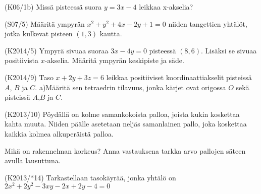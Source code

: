 \begin{tehtava}(K06/1b)
	Missä pisteessä suora $y=3x-4$ leikkaa x-akselia? 
\end{tehtava}

\begin{tehtava} (S07/5)
	Määritä ympyrän $x^2+y^2+4x-2y+1=0$ niiden tangettien yhtälöt, jotka kulkevat pisteen $(1,3)$ kautta.
\end{tehtava}



\begin{tehtava}(K2014/5)
Ympyrä sivuaa suoraa $3x-4y=0$ pisteessä $(8,6)$. Lisäksi se sivuaa positiivista $x$-akselia.
Määritä ympyrän keskipiste ja säde. 
\end{tehtava}


\begin{tehtava}(K2014/9)
Taso $x+2y+3z=6$ leikkaa positiiviset koordinaattiakselit pisteissä $A$, $B$ ja $C$.
a)Määritä sen tetraedrin tilavuus, jonka kärjet ovat origossa $O$ sekä pisteissä $A$,$B$ ja $C$. 
\end{tehtava}


\begin{tehtava}(K2013/10)
Pöydällä on kolme samankokoista palloa, joista kukin koskettaa kahta muuta. Niiden päälle asetetaan neljäs samanlainen  pallo, joka koskettaa kaikkia kolmea alkuperäistä palloa.

Mikä on rakennelman korkeus? Anna vastauksena tarkka arvo pallojen säteen avulla lausuttuna. 
\end{tehtava}


\begin{tehtava} (K2013/*14)
Tarkastellaan tasokäyrää, jonka yhtälö on $2x^2+2y^2-3xy-2x+2y-4=0$
\begin{alakohdat}
	\end{alakohdat}
\end{tehtava}


